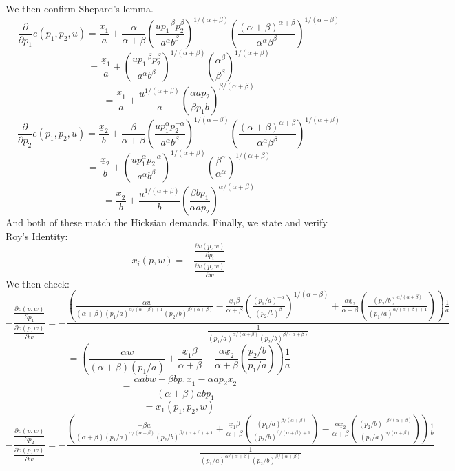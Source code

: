 \documentclass[10pt,letter]{article}
\begin{document}
We then confirm Shepard's lemma.
\[ \frac{\partial}{\partial p_1} e(p_1, p_2, u) = \frac{\underline{x}_1}{a} + \frac{\alpha}{\alpha+\beta}\left( \frac{u p_1^{-\beta}p_2^{\beta}}{a^{\alpha}b^{\beta}} \right)^{1/(\alpha + \beta)} \left(  \frac{(\alpha + \beta)^{\alpha+\beta}}{\alpha^{\alpha}\beta^{\beta}} \right)^{1/(\alpha + \beta)} \]
\[ = \frac{\underline{x}_1}{a} + \left( \frac{u p_1^{-\beta}p_2^{\beta}}{a^{\alpha}b^{\beta}} \right)^{1/(\alpha + \beta)} \left(  \frac{\alpha^\beta}{\beta^{\beta}} \right)^{1/(\alpha + \beta)} \]
\[ = \frac{\underline{x}_1}{a} + \frac{u^{1/(\alpha+\beta)}}{a}\left( \frac{ \alpha a p_2}{\beta p_1 b} \right)^{\beta/(\alpha + \beta)}  \]
\[ \frac{\partial}{\partial p_2} e(p_1, p_2, u) = \frac{\underline{x}_2}{b} + \frac{\beta}{\alpha+\beta}\left( \frac{u p_1^{\alpha}p_2^{-\alpha}}{a^{\alpha}b^{\beta}} \right)^{1/(\alpha + \beta)} \left(  \frac{(\alpha + \beta)^{\alpha+\beta}}{\alpha^{\alpha}\beta^{\beta}} \right)^{1/(\alpha + \beta)} \]
\[ = \frac{\underline{x}_2}{b} + \left( \frac{u p_1^{\alpha}p_2^{-\alpha}}{a^{\alpha}b^{\beta}} \right)^{1/(\alpha + \beta)} \left(  \frac{\beta^\alpha}{\alpha^{\alpha}} \right)^{1/(\alpha + \beta)} \]
\[ = \frac{\underline{x}_2}{b} + \frac{u^{1/(\alpha+\beta)}}{b}\left( \frac{ \beta b p_1}{\alpha a p_2} \right)^{\alpha/(\alpha + \beta)}  \]
And both of these match the Hicksian demands. Finally, we state and verify Roy's Identity:
\[ x_i(p, w) = -\frac{\frac{\partial v(p,w)}{\partial p_i}}{\frac{\partial v(p,w)}{\partial w}} \]
We then check:
\[ -\frac{\frac{\partial v(p,w)}{\partial p_1}}{\frac{\partial v(p,w)}{\partial w}} = - \frac{\left(\frac{-\alpha w}{(\alpha + \beta)(p_1/a)^{\alpha/(\alpha+\beta) + 1}(p_2/b)^{\beta/(\alpha+\beta)}} - \frac{\underline{x}_1 \beta}{\alpha + \beta}\left(\frac{(p_1/a)^{-\alpha}}{(p_2/b)^\beta}\right)^{1/(\alpha+\beta)} + \frac{\alpha \underline{x}_2}{\alpha + \beta} \left(\frac{(p_2/b)^{\alpha/(\alpha+\beta)}}{(p_1/a)^{\alpha/(\alpha+\beta) + 1}}\right) \right)\frac{1}{a}}{\frac{1}{(p_1/a)^{\alpha/(\alpha+\beta)}(p_2/b)^{\beta/(\alpha+\beta)}}} \]
\[ = \left(\frac{\alpha w}{(\alpha + \beta)(p_1/a)} + \frac{\underline{x}_1 \beta}{\alpha + \beta} - \frac{\alpha \underline{x}_2}{\alpha + \beta} \left(\frac{p_2/b}{p_1/a}\right) \right)\frac{1}{a} \]
\[ = \frac{\alpha ab w + \beta b p_1 \underline{x}_1 - \alpha a p_2 \underline{x}_2}{(\alpha + \beta)abp_1} \]
\[ = x_1(p_1, p_2, w) \]
\[ -\frac{\frac{\partial v(p,w)}{\partial p_2}}{\frac{\partial v(p,w)}{\partial w}} = - \frac{\left(\frac{-\beta w}{(\alpha + \beta)(p_1/a)^{\alpha/(\alpha+\beta)}(p_2/b)^{\beta/(\alpha+\beta)+1}} + \frac{\underline{x}_1 \beta}{\alpha + \beta}\left(\frac{(p_1/a)^{\beta/(\alpha+\beta)}}{(p_2/b)^{\beta/(\alpha+\beta)+1}}\right) - \frac{\alpha \underline{x}_2}{\alpha + \beta} \left(\frac{(p_2/b)^{-\beta/(\alpha+\beta)}}{(p_1/a)^{\alpha/(\alpha+\beta)}}\right) \right)\frac{1}{b}}{\frac{1}{(p_1/a)^{\alpha/(\alpha+\beta)}(p_2/b)^{\beta/(\alpha+\beta)}}} \]
\end{document}
